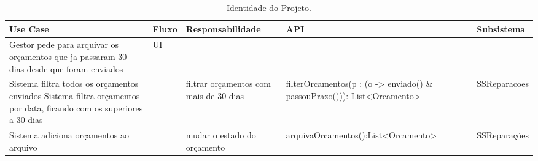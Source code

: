 \documentclass[../relatorio.tex]{subfiles}
\begin{document}
\begin{landscape}
    \begin{table}[!h]
        \centering
        \begin{tabular}{|p{5cm}|p{1cm}|p{4cm}|p{6cm}|p{3cm}|}
            \hline
            \rowcolor{gray!20!white}
            Use Case & Fluxo    & Responsabilidade & API & Subsistema    \\
            \hline
            \rowcolor{yellow}
            Gestor pede para arquivar os orçamentos que ja passaram 30 dias desde que foram enviados
                    & UI 
                    &                                        
                    &                                                          
                    &               
            \\
            \hline
            Sistema filtra todos os orçamentos enviados
            Sistema filtra orçamentos por data, ficando com os superiores a 30 dias
                    &          
                    & filtrar orçamentos com mais de 30 dias 
                    & filterOrcamentos(p : (o -> enviado() \& passouPrazo())): List<Orcamento> 
                    & SSReparacoes 
            \\
            \hline
            Sistema adiciona orçamentos ao arquivo                                  
                    &          
                    & mudar o estado do orçamento    
                    & arquivaOrcamentos():List<Orcamento>                    
                    & SSReparações 
            \\
            \hline
        \end{tabular}
        \caption{Identidade do Projeto.}
    \end{table}
\end{landscape}
\end{document}
